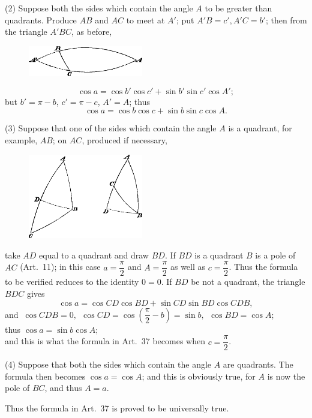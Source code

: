 \documentclass{book}[2004/02/16]
\begin{document}
\begin{mainmatter}
\begin{spacing}{1.3}
(2) Suppose both the sides which contain the angle $A$ to be
greater than quadrants. Produce $AB$ and $AC$ to meet at $A'$; put
$A'B = c', A'C = b'$; then from the triangle $A'BC$, as before,
\begin{figure}[htp]
\centering
\includegraphics[width=5.0cm]{images/027f2c}
\end{figure}
\[
  \cos a = \cos b' \cos c' + \sin b' \sin c' \cos A';
\]
but $b' = \pi - b$, $c' = \pi - c$, $A' = A$; thus
\[
  \cos a = \cos b \cos c + \sin b \sin c \cos A.
\]

(3) Suppose that one of the sides which contain the angle $A$
is a quadrant, for example, $AB$; on $AC$, produced if necessary,
\begin{figure}[htp]
\centering
\includegraphics[width=5.0cm]{images/028fc}
\end{figure}
take $AD$ equal to a quadrant and draw $BD$. If $BD$ is a quadrant
$B$ is a pole of $AC$ (Art.\ 11); in this case $a = \dfrac{\pi}{2}$ and $A = \dfrac{\pi}{2}$ as well
as $c = \dfrac{\pi}{2}$. Thus the formula to be verified reduces to the identity
$0 = 0$. If $BD$ be not a quadrant, the triangle $BDC$ gives
\[
\cos a = \cos CD\cos BD + \sin CD\sin BD \cos CDB ,
\]
and \hfill$\ \cos CDB = 0,\ \
  \cos CD = \cos \left(\dfrac{\pi}{2} - b\right) = \sin b ,\ \
 \cos BD = \cos A $;\hfill\phantom{and}\\[1ex]
thus \hfill$ \cos a = \sin b \cos A ; $\hfill \phantom{thus}\\[2ex]
and this is what the formula in Art.\ 37 becomes when $c = \dfrac{\pi}{2}$.

(4) Suppose that both the sides which contain the angle $A$
are quadrants. The formula then becomes $\cos a = \cos A $; and this
is obviously true, for $A$ is now the pole of $BC$, and thus $A = a$.

Thus the formula in Art.\ 37 is proved to be universally true.

\end{spacing}
\end{mainmatter}
\end{document}
